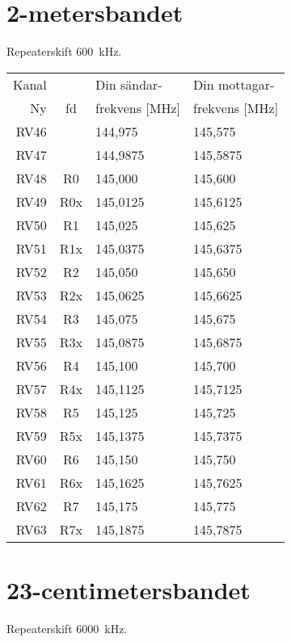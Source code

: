 \section{2-metersbandet}
Repeaterskift 600~kHz.

\begin{tabular}{ r | c | l | l }
	Kanal & & Din sändar- & Din mottagar- \\
	Ny    & fd & frekvens [MHz] & frekvens [MHz] \\
	\hline
	RV46 & & 144,975 & 145,575\\
	RV47 & & 144,9875 & 145,5875\\
	RV48 & R0 & 145,000 & 145,600 \\
	RV49 & R0x & 145,0125 & 145,6125 \\
	RV50 & R1 & 145,025 & 145,625 \\
	RV51 & R1x & 145,0375 & 145,6375 \\
	RV52 & R2 & 145,050 & 145,650 \\
	RV53 & R2x & 145,0625 & 145,6625 \\
	RV54 & R3 & 145,075 & 145,675 \\
	RV55 & R3x & 145,0875 & 145,6875 \\
	RV56 & R4 & 145,100 & 145,700 \\
	RV57 & R4x & 145,1125 & 145,7125 \\
	RV58 & R5 & 145,125 & 145,725 \\
	RV59 & R5x & 145,1375 & 145,7375 \\
	RV60 & R6 & 145,150 & 145,750 \\
	RV61 & R6x & 145,1625 & 145,7625 \\
	RV62 & R7 & 145,175 & 145,775 \\
	RV63 & R7x & 145,1875 & 145,7875 \\
\end{tabular}

\section{23-centimetersbandet}
Repeaterskift 6000~kHz.

